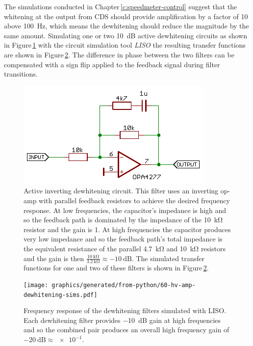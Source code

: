The simulations conducted in Chapter\,\ref{c:speedmeter-control} suggest that the whitening at the output from \gls{CDS} should provide amplification by a factor of \num{10} above \SI{100}{\hertz}, which means the dewhitening should reduce the magnitude by the same amount. Simulating one or two \SI{10}{\deci\bel} active dewhitening circuits as shown in Figure\,\ref{fig:hv-amp-dewhitening-circuit} with the circuit simulation tool \emph{\gls{LISO}} the resulting transfer functions are shown in Figure\,\ref{fig:hv-amp-dewhitening-sims}. The difference in phase between the two filters can be compensated with a sign flip applied to the feedback signal during filter transitions.

\begin{figure}
  \centering
  \includegraphics[width=0.6\columnwidth]{graphics/60-hv-amp-dewhitening.pdf}
  \caption[Active inverting dewhitening circuit]{Active inverting dewhitening circuit. This filter uses an inverting op-amp with parallel feedback resistors to achieve the desired frequency response. At low frequencies, the capacitor's impedance is high and so the feedback path is dominated by the impedance of the \SI{10}{\kilo\ohm} resistor and the gain is \num{1}. At high frequencies the capacitor produces very low impedance and so the feedback path's total impedance is the equivalent resistance of the parallel \SI{4.7}{\kilo\ohm} and \SI{10}{\kilo\ohm} resistors and the gain is then $\frac{\SI{10}{\kilo\ohm}}{\SI{3.2}{\kilo\ohm}} \approx \SI{-10}{\deci\bel}$. The simulated transfer functions for one and two of these filters is shown in Figure\,\ref{fig:hv-amp-dewhitening-sims}.}
  \label{fig:hv-amp-dewhitening-circuit}
\end{figure}

\begin{figure}
  \centering
  \texttt{[image: graphics/generated/from-python/60-hv-amp-dewhitening-sims.pdf]}
  \caption[Simulated dewhitening filter frequency response]{Frequency response of the dewhitening filters simulated with \gls{LISO}. Each dewhitening filter provides \SI{-10}{\deci\bel} gain at high frequencies and so the combined pair produces an overall high frequency gain of $\SI{-20}{\deci\bel} \approx \num{e-1}$.}
  \label{fig:hv-amp-dewhitening-sims}
\end{figure}

